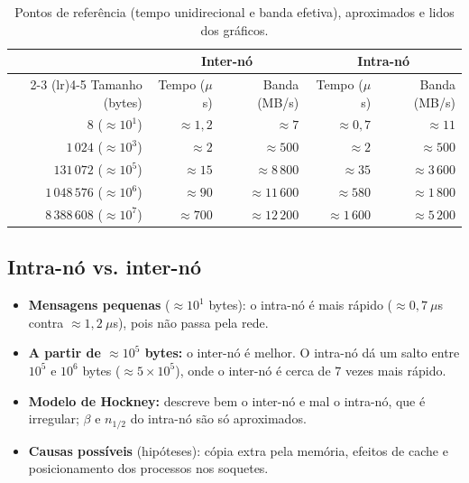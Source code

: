 \documentclass[a4paper,12pt]{article}
\begin{document}
\begin{table}[H]
    \centering
    \begin{tabular}{rrrrr}
    \toprule
        & \multicolumn{2}{c}{Inter-nó} & \multicolumn{2}{c}{Intra-nó} \\
        \cmidrule(lr){2-3} \cmidrule(lr){4-5}
        Tamanho (bytes) & Tempo ($\mu$s) & Banda (MB/s) & Tempo ($\mu$s) & Banda (MB/s) \\
    \midrule
        $8$ ($\approx 10^1$)               & $\approx 1{,}2$ & $\approx 7$      & $\approx 0{,}7$ & $\approx 11$ \\
        $1\,024$ ($\approx 10^3$)          & $\approx 2$     & $\approx 500$    & $\approx 2$     & $\approx 500$ \\
        $131\,072$ ($\approx 10^5$)        & $\approx 15$    & $\approx 8\,800$ & $\approx 35$    & $\approx 3\,600$ \\
        $1\,048\,576$ ($\approx 10^6$)     & $\approx 90$    & $\approx 11\,600$& $\approx 580$   & $\approx 1\,800$ \\
        $8\,388\,608$ ($\approx 10^7$)     & $\approx 700$   & $\approx 12\,200$& $\approx 1\,600$& $\approx 5\,200$ \\
    \bottomrule
    \end{tabular}
    \caption{Pontos de referência (tempo unidirecional e banda efetiva),
    aproximados e lidos dos gráficos.}
    \label{tab:pontos}
\end{table}

\subsection{Intra-nó vs. inter-nó}

\begin{itemize}
    \item \textbf{Mensagens pequenas} ($\approx 10^1$ bytes): o intra-nó é mais
          rápido ($\approx 0{,}7~\mu$s contra $\approx 1{,}2~\mu$s), pois não
          passa pela rede.
    \item \textbf{A partir de $\approx 10^5$ bytes:} o inter-nó é melhor. O
          intra-nó dá um salto entre $10^5$ e $10^6$ bytes
          ($\approx 5\times 10^5$), onde o inter-nó é cerca de $7$ vezes mais
          rápido.
    \item \textbf{Modelo de Hockney:} descreve bem o inter-nó e mal o
          intra-nó, que é irregular; $\beta$ e $n_{1/2}$ do intra-nó são só
          aproximados.
    \item \textbf{Causas possíveis} (hipóteses): cópia extra
          pela memória, efeitos de cache e posicionamento dos processos nos
          soquetes.
\end{itemize}
\end{document}
